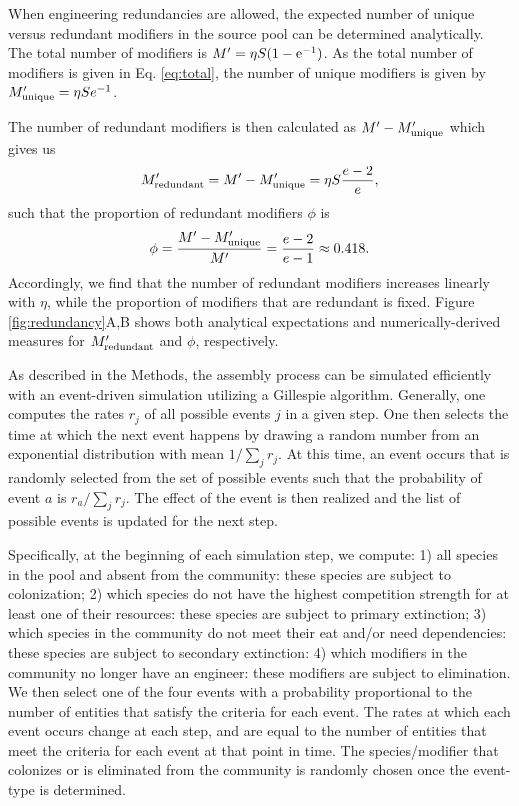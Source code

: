 \documentclass[twocolumn,preprintnumbers,amsmath,amssymb,superscriptaddress,linenumbers]{revtex4-1}
\newcommand{\rr}[1]{{\rm #1}}
\begin{document}
When engineering redundancies are allowed, the expected number of unique versus redundant modifiers in the source pool can be determined analytically.
The total number of modifiers is $M^\prime = \eta S (1 - \rr{e}^{-1})$.
As the total number of modifiers is given in Eq. \ref{eq:total}, the number of unique modifiers is given by $M^\prime_{\rr{unique}} = \eta S e^{-1}$.

The number of redundant modifiers is then calculated as $M^\prime - M^\prime_{\rr{unique}}$ which gives us
\begin{equation}
M^\prime_{\rr{redundant}} =M^\prime - M^\prime_{\rr{unique}}= \eta S \frac{e - 2}{e},
\label{eq:redundant}
\end{equation}
such that the proportion of redundant modifiers $\phi$ is
\begin{equation}
\phi = \frac{M^\prime - M^\prime_{\rr{unique}}}{M^\prime} = \frac{e-2}{e-1} \approx 0.418.
\label{eq:redundantprop}
\end{equation}
Accordingly, we find that the number of redundant modifiers increases linearly with $\eta$, while the proportion of modifiers that are redundant is fixed.
Figure \ref{fig:redundancy}A,B shows both analytical expectations and numerically-derived measures for $M^\prime_{\rr{redundant}}$ and $\phi$, respectively.

As described in the Methods, the assembly process can be simulated efficiently with an event-driven simulation utilizing a Gillespie algorithm.
Generally, one computes the rates $r_j$ of all possible events $j$ in a given step.
One then selects the time at which the next event happens by drawing a random number from an exponential distribution with mean $1/\sum_j{r_j}$.
At this time, an event occurs that is randomly selected from the set of possible events such that the probability of event $a$ is $r_a/\sum_j{r_j}$.
The effect of the event is then realized and the list of possible events is updated for the next step.

Specifically, at the beginning of each simulation step, we compute:
1) all species in the pool and absent from the community: these species are subject to colonization;
2) which species do not have the highest competition strength for at least one of their resources: these species are subject to primary extinction;
3) which species in the community do not meet their eat and/or need dependencies: these species are subject to secondary extinction:
4) which modifiers in the community no longer have an engineer: these modifiers are subject to elimination.
We then select one of the four events with a probability proportional to the number of entities that satisfy the criteria for each event.
The rates at which each event occurs change at each step, and are equal to the number of entities that meet the criteria for each event at that point in time.
The species/modifier that colonizes or is eliminated from the community is randomly chosen once the event-type is determined.
\end{document}
